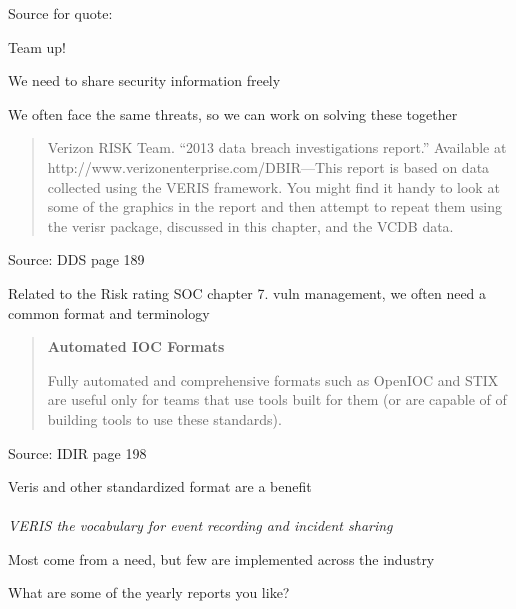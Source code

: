 \documentclass[Screen16to9,17pt]{foils}
\begin{document}
Source for quote: 



\begin{list1}
\item Team up!
\item We need to share security information freely
\item We often face the same threats, so we can work on solving these together
\end{list1}






\begin{quote}
Verizon RISK Team. “2013 data breach investigations report.” Available at http://www.verizonenterprise.com/DBIR—This report is based on data collected using the VERIS framework. You might find it handy to look at some of the graphics in the report and then attempt to repeat them using the verisr package, discussed in this chapter, and the VCDB data.
\end{quote}
Source: DDS page 189

Related to the Risk rating SOC chapter 7. vuln management, we often need a common format and terminology


\begin{quote}{\bf
Automated IOC Formats}

Fully automated and comprehensive formats such as OpenIOC and STIX are useful only for teams that use tools built for them (or are capable of of building tools to use these standards).
\end{quote}
Source: IDIR page 198


\begin{list2}
\item Veris and other standardized format are a benefit\\
\\
\emph{VERIS the vocabulary for event recording and incident sharing}
\item Most come from a need, but few are implemented across the industry
\end{list2}

\centerline{What are some of the yearly reports you like?}
\end{document}
